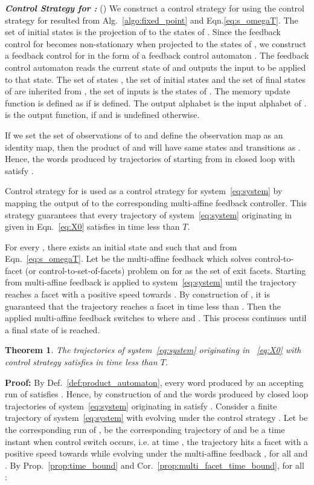 \documentclass{ifacconf}
\newtheorem{theorem}{Theorem}
\newcommand{\TIMEBOUND}{\ensuremath{T}}
\begin{document}
\textbf{\emph{Control Strategy for : }} (\cite{Kloetzer:2008NonDet})
We construct a control strategy  for  using the control strategy  for  resulted from Alg.~\ref{algo:fixed_point} and Eqn.\eqref{eq:s_omegaT}.
The set of initial states  is the projection of  to the states of .
Since the feedback control  for  becomes non-stationary when projected to the states of , we construct a feedback control for  in the form of a feedback control automaton . 
The feedback control automaton  reads the current state of  and outputs the input to be applied to that state. 
The set of states , the set of initial states  and the set of final states  of  are inherited from , the set of inputs  is the states of . 
The memory update function  is defined as   if  is defined. The output alphabet  is the input alphabet of .  is the output function,  if  and  is undefined otherwise. 



If we set the set of observations of  to  and define the observation map  as an identity map, then the product of  and  will have same states and transitions as . 
Hence, the words produced by trajectories of  starting from  in closed loop with  satisfy .


Control strategy  for  is used as a control strategy for system~\eqref{eq:system} by mapping the output of  to the corresponding multi-affine feedback controller. 
This strategy guarantees that every trajectory of system~\eqref{eq:system} originating in  given in Eqn.~\eqref{eq:X0} satisfies  in time less than \TIMEBOUND.
 
For every , there exists an initial state  and  such that  and  from Eqn.~\eqref{eq:s_omegaT}.
Let  be the multi-affine feedback which solves control-to-facet (or control-to-set-of-facets) problem on  for  as the set of exit facets. Starting from  multi-affine feedback  is applied to system~\eqref{eq:system} until the trajectory reaches a facet  with a positive speed towards . By construction of , it is guaranteed that the trajectory reaches a facet  in time less than .
Then the applied multi-affine feedback switches to  where  and . This process continues until a final state  of  is reached.



\begin{theorem}\label{thm:main}
The trajectories of system~\eqref{eq:system} originating in ~\eqref{eq:X0} with control strategy  satisfies  in time less than \TIMEBOUND.  
\end{theorem}	
{\bf Proof:}
By Def.~\ref{def:product_automaton}, every word produced by an accepting run of  satisfies . Hence, by construction of  and  the words produced by closed loop trajectories of system~\eqref{eq:system} originating in  satisfy .
Consider a finite trajectory  of system~\eqref{eq:system} with  evolving under the control strategy  .
Let   be the corresponding run of ,   be the corresponding trajectory of  and  be a time instant when control switch occurs, i.e. at time , the trajectory hits a facet  with a positive speed towards  while evolving under the multi-affine feedback , for all  and .
By Prop.~\ref{prop:time_bound} and Cor.~\ref{prop:multi_facet_time_bound}, for all :
\end{document}

